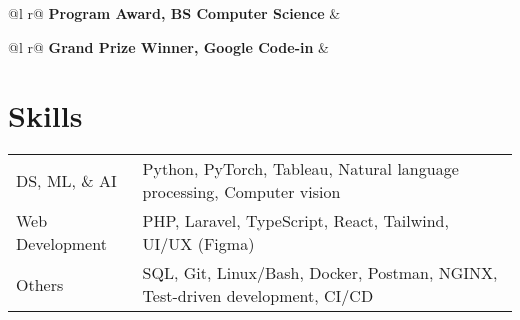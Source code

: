 \documentclass[a4paper, 10pt]{article}
\begin{document}
\begin{tabularx}{\linewidth}{ @{}l r@{} }
\textbf{Program Award, BS Computer Science} & \hfill {} \\ [3.75pt]
\end{tabularx}

\begin{tabularx}{\linewidth}{ @{}l r@{} }
\textbf{Grand Prize Winner, Google Code-in} & \hfill {} \\ [3.75pt]
\end{tabularx}
  


\section{Skills}
\begin{tabularx}{\linewidth}{@{}l X@{}}
DS, ML, \& AI &  \normalsize{Python, PyTorch, Tableau, Natural language processing, Computer vision}\\
Web Development  &  \normalsize{PHP, Laravel, TypeScript, React, Tailwind, UI/UX (Figma)}\\  
Others  &  \normalsize{SQL, Git, Linux/Bash, Docker, Postman, NGINX, Test-driven development, CI/CD}\\ 
\end{tabularx}

\vfill
{}
\end{document}
